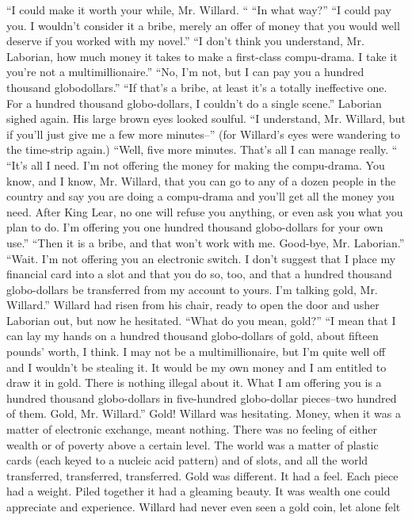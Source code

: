\documentclass[a4paper,12pt]{article}
\begin{document}
“I could make it worth your while, Mr. Willard. “
“In what way?”
“I could pay you. I wouldn’t consider it a bribe, merely an offer of money that you would well
deserve if you worked with my novel.”
“I don’t think you understand, Mr. Laborian, how much money it takes to make a first-class
compu-drama. I take it you’re not a multimillionaire.”
“No, I’m not, but I can pay you a hundred thousand globodollars.”
“If that’s a bribe, at least it’s a totally ineffective one. For a hundred thousand globo-dollars, I
couldn’t do a single scene.”
Laborian sighed again. His large brown eyes looked soulful. “I understand, Mr. Willard, but if
you’ll just give me a few more minutes--” (for Willard’s eyes were wandering to the time-strip again.)
“Well, five more minutes. That’s all I can manage really. “
“It’s all I need. I’m not offering the money for making the compu-drama. You know, and I know,
Mr. Willard, that you can go to any of a dozen people in the country and say you are doing a compu-drama
and you’ll get all the money you need. After King Lear, no one will refuse you anything, or even ask you
what you plan to do. I’m offering you one hundred thousand globo-dollars for your own use.”
“Then it is a bribe, and that won’t work with me. Good-bye, Mr. Laborian.”
“Wait. I’m not offering you an electronic switch. I don’t suggest that I place my financial card into
a slot and that you do so, too, and that a hundred thousand globo-dollars be transferred from my account to
yours. I’m talking gold, Mr. Willard.”
Willard had risen from his chair, ready to open the door and usher Laborian out, but now he
hesitated. “What do you mean, gold?”
“I mean that I can lay my hands on a hundred thousand globo-dollars of gold, about fifteen
pounds’ worth, I think. I may not be a multimillionaire, but I’m quite well off and I wouldn’t be stealing it.
It would be my own money and I am entitled to draw it in gold. There is nothing illegal about it. What I am
offering you is a hundred thousand globo-dollars in five-hundred globo-dollar pieces--two hundred of
them. Gold, Mr. Willard.”
Gold! Willard was hesitating. Money, when it was a matter of electronic exchange, meant nothing.
There was no feeling of either wealth or of poverty above a certain level. The world was a matter of plastic
cards (each keyed to a nucleic acid pattern) and of slots, and all the world transferred, transferred,
transferred.
Gold was different. It had a feel. Each piece had a weight. Piled together it had a gleaming beauty.
It was wealth one could appreciate and experience. Willard had never even seen a gold coin, let alone felt
\end{document}

